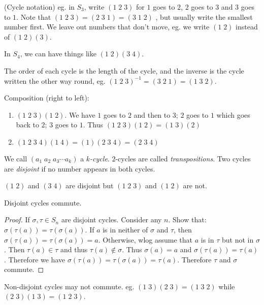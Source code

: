 \documentclass[a4paper]{article}
\begin{document}
\begin{notation}
  (Cycle notation) eg. in $S_3$, write $(1\;2\;3)$ for $1$ goes to $2$, $2$ goes to $3$ and $3$ goes to $1$. Note that $(1\; 2\; 3) = (2\; 3\; 1) = (3\; 1\; 2)$ , but usually write the smallest number first. We leave out numbers that don't move, eg. we write $(1\; 2)$ instead of $(1\; 2)(3)$.

  In $S_4$, we can have things like $(1\; 2)(3\; 4)$.
\end{notation}
\note The order of each cycle is the length of the cycle, and the inverse is the cycle written the other way round, eg. $(1\; 2\; 3)^{-1} = (3\; 2\; 1) = (1\; 3\; 2)$.

\begin{eg}
  Composition (right to left):
  \begin{enumerate}
    \item $(1\; 2\; 3)(1\; 2)$. We have $1$ goes to $2$ and then to $3$; $2$ goes to $1$ which goes back to $2$; $3$ goes to $1$. Thus $(1\; 2\; 3)(1\; 2) = (1\;3)(2)$
    \item $(1\; 2\; 3\; 4)(1\; 4) = (1)(2\; 3\; 4) = (2\; 3\; 4)$
  \end{enumerate}
\end{eg}
\begin{defi}
  We call $(a_1\; a_2\; a_3\cdots a_k)$ a \emph{$k$-cycle}. $2$-cycles are called \emph{transpositions}. Two cycles are \emph{disjoint} if no number appears in both cycles.
\end{defi}
\begin{eg}
  $(1\; 2)$ and $(3\; 4)$ are disjoint but $(1\; 2\; 3)$ and $(1\; 2)$ are not.
\end{eg}
\begin{lemma}
  Disjoint cycles commute.
\end{lemma}
\begin{proof}
  If $\sigma, \tau\in S_n$ are disjoint cycles. Consider any $n$. Show that: $\sigma(\tau(a)) = \tau(\sigma(a))$. If $a$ is in neither of $\sigma$ and $\tau$, then $\sigma(\tau(a)) = \tau(\sigma(a)) = a$. Otherwise, wlog assume that $a$ is in $\tau$ but not in $\sigma$. Then $\tau(a)\in \tau$ and thus $\tau(a)\not\in \sigma$. Thus $\sigma(a) = a$ and $\sigma(\tau(a)) = \tau(a)$. Therefore we have $\sigma(\tau(a)) = \tau(\sigma(a)) = \tau(a)$. Therefore $\tau$ and $\sigma$ commute.
\end{proof}
\note Non-disjoint cycles may not commute. eg. $(1\; 3)(2\; 3) = (1\; 3\; 2)$ while $(2\; 3)(1\; 3) = (1\; 2\; 3)$.
\end{document}
